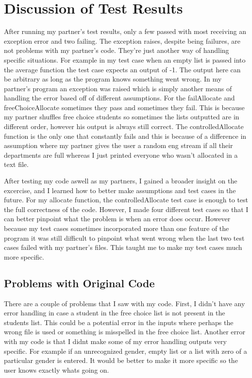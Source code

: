 \documentclass[12pt]{article}
\begin{document}
\section{Discussion of Test Results}

After running my partner's test results, only a few passed with most receiving an exception error and two failing. The exception raises, despite being failures, are not problems with my partner's code. They're just another way of handling specific situations. For example in my test case when an empty list is passed into the average function the test case expects an output of -1. The output here can be arbitrary as long as the program knows something went wrong. In my partner's program an exception was raised which is simply another means of handling the error based off of different assumptions. For the failAllocate and freeChoiceAllocate sometimes they pass and sometimes they fail. This is because my partner shuffles free choice students so sometimes the lists outputted are in different order, however his output is always still correct. The controlledAllocate function is the only one that constantly fails and this is because of a difference in assumption where my partner gives the user a random eng stream if all their departments are full whereas I just printed everyone who wasn't allocated in a text file. 

After testing my code aswell as my partners, I gained a broader insight on the excercise, and I learned how to better make assumptions and test cases in the future. For my allocate function, the controlledAllocate test case is enough to test the full correctness of the code. However, I made four different test cases so that I can better pinpoint what the problem is when an error does occur. However because my test cases sometimes incorporated more than one feature of the program it was still difficult to pinpoint what went wrong when the last two test cases failed with my partner's files. This taught me to make my test cases much more specific.  

\subsection{Problems with Original Code}

There are a couple of problems that I saw with my code. First, I didn't have any error handling in case a student in the free choice list is not present in the students list. This could be a potential error in the inputs where perhaps the wrong file is used or something is misspelled in the free choice list. Another error with my code is that I didnt make some of my error handling outputs very specific. For example if an unrecognized gender, empty list or a list with zero of a particular gender is entered. It would be better to make it more specific so the user knows exactly whats going on. 
\end{document}
